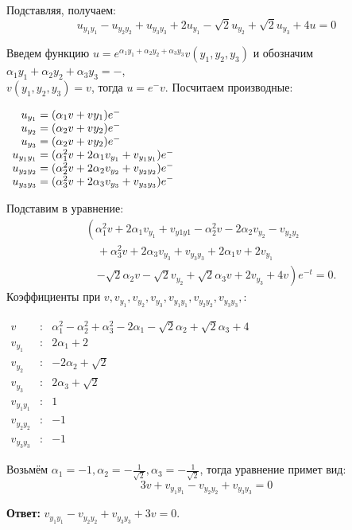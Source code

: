 \documentclass[a4paper,12pt]{article}
\begin{document}
Подставляя, получаем:
\begin{equation*}
    u_{y_1y_1} - u_{y_2y_2} + u_{y_3y_3} + 2u_{y_1} - \sqrt{2} u_{y_2} + \sqrt{2}u_{y_3} + 4u = 0
\end{equation*}

Введем функцию $u =e^{\alpha_1y_1 + \alpha_2y_2 + \alpha_3y_3}v(y_1,y_2,y_3)$ и обозначим $\alpha_1y_1 + \alpha_2y_2 + \alpha_3y_3 = -$, \\ $v(y_1,y_2,y_3) = v$,  тогда $u =e^{-}v$. Посчитаем производные:
\begin{flushleft}
\(
\begin{array}{r@{}l}
    u_{y_1} &{}= (\alpha_1v + v_{}y_1) e^{-} \\
    u_{y_2} &{}= (\alpha_2v + v_{}y_2) e^{-} \\
    u_{y_3} &{}= (\alpha_2v + v_{}y_2) e^{-} \\
    u_{y_1y_1} &{}= (\alpha_1^2v + 2\alpha_1v_{y_1} + v_{y_1y_1}) e^{-} \\
    u_{y_2y_2} &{}= (\alpha_2^2v + 2\alpha_2v_{y_2} + v_{y_2y_2}) e^{-}  \\
    u_{y_3y_3} &{}= (\alpha_3^2v + 2\alpha_3v_{y_3} + v_{y_3y_3}) e^{-} 
\end{array}
\)
\end{flushleft}
Подставим в уравнение:
\begin{align*}
    &\left( \alpha_1^2 v + 2\alpha_1 v_{y_1} + v_{y1y1}  
    - \alpha_2^2 v - 2\alpha_2 v_{y_2} - v_{y_2 y_2} \right. \\ 
    &\quad + \alpha_3^2 v + 2 \alpha_3 v_{y_3} + v_{y_3 y_3} 
    + 2 \alpha_1 v + 2 v_{y_1} \\ 
    &\quad \left. - \sqrt{2} \alpha_2 v - \sqrt{2} v_{y_2} 
    + \sqrt{2} \alpha_3 v + 2 v_{y_3} + 4 v \right) e^{-t} = 0.
\end{align*}
Коэффициенты при $v, v_{y_1}, v_{y_2}, v_{y_3}, v_{y_1y_1}, v_{y_2y_2}, v_{y_3y_3},$:
\begin{flushleft}
\(
\begin{array}{rcl}
v & : & \alpha_1^2 - \alpha_2^2 + \alpha_3^2 - 2\alpha_1 - \sqrt{2}\alpha_2 + \sqrt{2} \alpha_3 + 4 \\
v_{y_1} & : & 2\alpha_1 + 2\\
v_{y_2} & : & -2\alpha_2 + \sqrt{2}\\
v_{y_3} & : & 2\alpha_3 + \sqrt{2} \\
v_{y_1y_1} & : & 1 \\
v_{y_2y_2} & : & -1\\
v_{y_3y_3} & : & -1
\end{array}
\)
\end{flushleft}
Возьмём $\alpha_1=-1, \alpha_2=-\frac{1}{\sqrt{2}}, \alpha_3=-\frac{1}{\sqrt{2}}$, тогда уравнение примет вид:
\begin{equation*}
    3v + v_{y_1y_1} - v_{y_2y_2} + v_{y_3y_3}= 0
\end{equation*}

\textbf{Ответ:} $v_{y_1y_1} - v_{y_2y_2} + v_{y_3y_3} + 3v= 0$.
\end{document}
